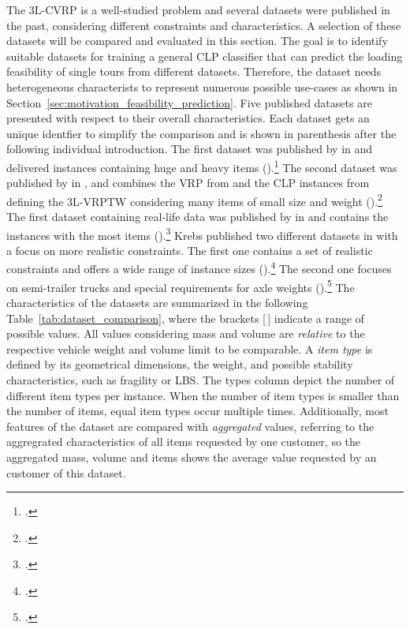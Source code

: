 The \gls{3L-CVRP} is a well-studied problem and several datasets were published in the past, considering
different constraints and characteristics. A selection of these datasets will be compared and evaluated
in this section. The goal is to identify suitable datasets for training a general \gls{CLP} classifier that can predict
the loading feasibility of single tours from different datasets. Therefore, the dataset needs
heterogeneous characterists to represent numerous possible use-cases
as shown in Section~\ref{sec:motivation_feasibility_prediction}. Five published
 datasets are presented with respect to their overall characteristics.
Each dataset gets an unique identfier to simplify the comparison and is shown in parenthesis
after the following individual introduction. The first  dataset was published by \citeauthor{gendreau_tabu_2006} in
\citeyear{gendreau_tabu_2006} and delivered instances containing huge and heavy items (\gendreauDataSet).\footcite[cf.][]{gendreau_tabu_2006}
The second dataset was published by \citeauthor{moura_integrated_2009} in \citeyear{moura_integrated_2009},
and combines the \gls{VRP} from \citeauthor{solomon_algorithms_1987} and the \gls{CLP} instances from
\citeauthor{bischoff_issues_1995} defining the \gls{3L-VRPTW} considering
many items of small size and weight (\mouraDataSet).\footcites[cf.][]{solomon_algorithms_1987}[][]{bischoff_issues_1995}[][]{moura_integrated_2009}
The first dataset containing real-life data was published by \citeauthor{ceschia_local_2013} in \citeyear{ceschia_local_2013}
and contains the instances with the most items (\ceschiaDataSet).\footcite[cf.][]{ceschia_local_2013}
Krebs published two different datasets in
\citeyear{krebs_advanced_2021} with a focus on more realistic constraints. The first one contains a set
of realistic constraints and offers a wide range of instance sizes (\krebsADataSet).\footcite[cf.][]{krebs_advanced_2021}
The second one focuses on semi-trailer trucks and special requirements for axle weights (\krebsBDataSet).\footcite[cf.][]{krebs_axle_2021}
The characteristics of the datasets are summarized in the following Table~\ref{tab:dataset_comparison},
where the brackets [\,] indicate a range of possible values. All values considering mass and volume are
\textit{relative} to the respective vehicle weight and volume limit to be comparable. A \textit{item type} is
defined by its geometrical dimensions, the weight, and possible stability characteristics, such as fragility or \gls{LBS}.
The types column depict the number of different item types per instance.
When the number of item types is smaller than the number of items, equal item types occur multiple times. Additionally,
most features of the dataset are compared with \textit{aggregated}  values, referring to the aggregrated characteristics
of all items requested by one customer, so the aggregated mass, volume and items shows the average value requested by an
customer of this dataset.

